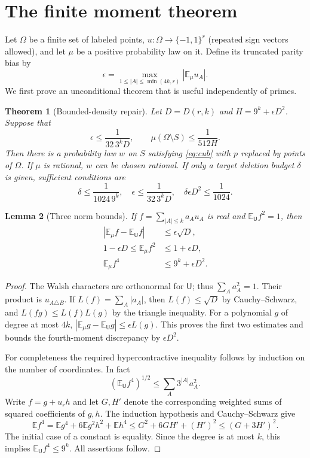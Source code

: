 \documentclass[11pt]{article}
\newtheorem{theorem}{Theorem}[section]
\newtheorem{lemma}[theorem]{Lemma}
\theoremstyle{remark}\newtheorem{remark}[theorem]{Remark}
\newcommand{\E}{\mathbb E}
\newcommand{\U}{\mathsf U}
\newcommand{\abs}[1]{\left|#1\right|}
\begin{document}
\section{The finite moment theorem}
Let $\Omega$ be a finite set of labeled points, $u:\Omega\to\{-1,1\}^r$ (repeated sign vectors allowed), and let $\mu$ be a positive probability law on it. Define its truncated parity bias by
\[
 \epsilon=\max_{1\le |A|\le\min(4k,r)}\abs{\E_\mu u_A}.
\]
We first prove an unconditional theorem that is useful independently of primes.
\begin{theorem}[Bounded-density repair]\label{thm:repair}
Let $D=D(r,k)$ and $H=9^k+\epsilon D^2$. Suppose that
\begin{equation}\label{eq:eps}
 \epsilon\le\frac{1}{32\,3^kD},\qquad
 \mu(\Omega\setminus S)\le\frac{1}{512H}.
\end{equation}
Then there is a probability law $w$ on $S$ satisfying \eqref{eq:cub} with $p$ replaced by points of $\Omega$. If $\mu$ is rational, $w$ can be chosen rational. If only a target deletion budget $\delta$ is given, sufficient conditions are
\begin{equation}\label{eq:budget}
 \delta\le\frac1{1024\,9^k},\quad
 \epsilon\le\frac1{32\,3^kD},\quad
 \delta\epsilon D^2\le\frac1{1024}.
\end{equation}
\end{theorem}
\begin{lemma}[Three norm bounds]\label{lem:norms}
If $f=\sum_{|A|\le k}a_Au_A$ is real and $\E_\U f^2=1$, then
\begin{align*}
 \abs{\E_\mu f-\E_\U f}&\le\epsilon\sqrt D,\\
 1-\epsilon D\le \E_\mu f^2&\le1+\epsilon D,\\
 \E_\mu f^4&\le 9^k+\epsilon D^2.
\end{align*}
\end{lemma}
\begin{proof}
The Walsh characters are orthonormal for $\U$; thus $\sum_Aa_A^2=1$. Their product is $u_{A\triangle B}$. If $L(f)=\sum_A|a_A|$, then $L(f)\le\sqrt D$ by Cauchy--Schwarz, and $L(fg)\le L(f)L(g)$ by the triangle inequality. For a polynomial $g$ of degree at most $4k$, $|\E_\mu g-\E_\U g|\le\epsilon L(g)$. This proves the first two estimates and bounds the fourth-moment discrepancy by $\epsilon D^2$.

For completeness the required hypercontractive inequality follows by induction on the number of coordinates. In fact
\[
 (\E_\U f^4)^{1/2}\le\sum_A 3^{|A|}a_A^2.
\]
Write $f=g+u_r h$ and let $G,H'$ denote the corresponding weighted sums of squared coefficients of $g,h$. The induction hypothesis and Cauchy--Schwarz give
\[
 \E f^4=\E g^4+6\E g^2h^2+\E h^4
 \le G^2+6GH'+(H')^2\le(G+3H')^2.
\]
The initial case of a constant is equality. Since the degree is at most $k$, this implies $\E_\U f^4\le9^k$. All assertions follow.
\end{proof}
\end{document}
